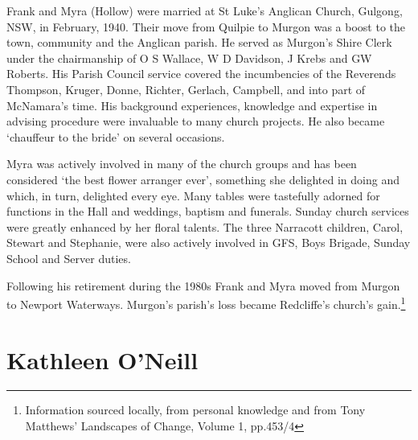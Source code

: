 Frank and Myra (Hollow) were married at St Luke's Anglican Church, Gulgong, NSW, in February, 1940. Their move from Quilpie to Murgon was a boost to the town, community and the Anglican parish. He served as Murgon's Shire Clerk under the chairmanship of O S Wallace, W D Davidson, J Krebs and GW Roberts. His Parish Council service covered the incumbencies of the Reverends Thompson, Kruger, Donne, Richter, Gerlach, Campbell, and into part of McNamara's time. His background experiences, knowledge and expertise in advising procedure were invaluable to many church projects. He also became `chauffeur to the bride' on several occasions.



Myra was actively involved in many of the church groups and has been considered `the best flower arranger ever', something she delighted in doing and which, in turn, delighted every eye. Many tables were tastefully adorned for functions in the Hall and weddings, baptism and funerals. Sunday church services were greatly enhanced by her floral talents. The three Narracott children, Carol, Stewart and Stephanie, were also actively involved in GFS, Boys Brigade, Sunday School and Server duties.



Following his retirement during the 1980s Frank and Myra moved from Murgon to Newport Waterways. Murgon's parish's loss became Redcliffe's church's gain.\footnote{Information sourced locally, from personal knowledge and from Tony Matthews' Landscapes of Change, Volume 1, pp.453/4}


\section{Kathleen O'Neill}



